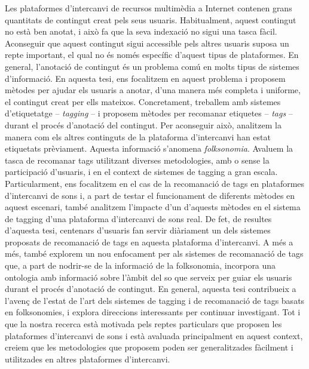 Les plataformes d'intercanvi de recursos multimèdia a Internet contenen grans quantitats de contingut creat pels seus usuaris.
Habitualment, aquest contingut no està ben anotat, i això fa que la seva indexació no sigui una tasca fàcil. Aconseguir que aquest contingut sigui accessible pels altres usuaris suposa un repte important, el qual no és només específic d'aquest tipus de plataformes. En general, l'anotació de contingut és un problema comú en molts tipus de sistemes d'informació.
En aquesta tesi, ens focalitzem en aquest problema i proposem mètodes per ajudar els usuaris a anotar, d'una manera més completa i uniforme, el contingut creat per ells mateixos. Concretament, treballem amb sistemes d'etiquetatge -- \emph{tagging} -- i proposem mètodes per recomanar etiquetes -- \emph{tags} -- durant el procés d'anotació del contingut.
Per aconseguir això, analitzem la manera com els altres continguts de la plataforma d'intercanvi han estat etiquetats prèviament. Aquesta informació s'anomena \emph{folksonomia}.
Avaluem la tasca de recomanar tags utilitzant diverses metodologies, amb o sense la participació d'usuaris, i en el context de sistemes de tagging a gran escala.
Particularment, ens focalitzem en el cas de la recomanació de tags en plataformes d'intercanvi de sons i, a part de testar el funcionament de diferents mètodes en aquest escenari, també analitzem l'impacte d'un d'aquests mètodes en el sistema de tagging d'una plataforma d'intercanvi de sons real.
De fet, de resultes d'aquesta tesi, centenars d'usuaris fan servir diàriament un dels sistemes proposats de recomanació de tags en aquesta plataforma d'intercanvi.
A més a més, també explorem un nou enfocament per als sistemes de recomanació de tags que, a part de nodrir-se de la informació de la folksonomia, incorpora una ontologia amb informació sobre l'àmbit del so que serveix per guiar els usuaris durant el procés d'anotació de contingut.
En general, aquesta tesi contribueix a l'avenç de l'estat de l'art dels sistemes de tagging i de recomanació de tags basats en folksonomies, i explora direccions interessants per continuar investigant.
Tot i que la nostra recerca està motivada pels reptes particulars que proposen les plataformes d'intercanvi de sons i està avaluada principalment en aquest context, creiem que les metodologies que proposem poden ser generalitzades fàcilment i utilitzades en altres plataformes d'intercanvi.